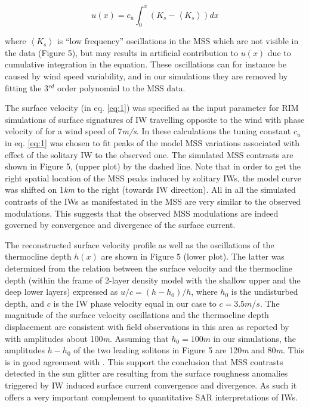 \documentclass[draft,grl]{agutex}
\begin{document}
\begin{article}
\begin{equation}
u(x) = c_u \int_0^x \left( K_s - \left\langle K_s \right\rangle \right) dx
\label{eq:1}
\end{equation}

\noindent where $\left\langle K_s \right\rangle$ is ``low frequency'' oscillations in the MSS which are not visible in the data (Figure 5), but may results in artificial contribution to $u(x)$ due to cumulative integration in the equation.  These oscillations can for instance be caused by wind speed variability, and in our simulations they are removed by fitting the 3${}^{rd}$ order polynomial to the MSS data.  

The surface velocity (in eq. \eqref{eq:1}) was specified as the input parameter for RIM simulations of surface signatures of IW travelling opposite to the wind with phase velocity of  for a wind speed of 7\textit{m/s}. In these calculations the tuning constant $c_u$ in eq. \eqref{eq:1} was chosen to fit peaks of the model MSS variations associated with effect of the solitary IW to the observed one. The simulated MSS contrasts are shown in Figure 5, (upper plot) by the dashed line. Note that in order to get the right spatial location of the MSS peaks induced by solitary IWs, the model curve was shifted on 1\textit{km} to the right (towards IW direction). All in all the simulated contrasts of the IWs as manifestated in the MSS are very similar to the observed modulations. This suggests that the observed MSS modulations are indeed governed by convergence and divergence of the surface current.

The reconstructed surface velocity profile as well as the oscillations of the thermocline depth $h(x)$ are shown in Figure 5 (lower plot). The latter was determined from the relation between the surface velocity and the thermocline depth (within the frame of 2-layer density model with the shallow upper and the deep lower layers) expressed as $u/c = \left( h-h_0 \right) / h $, where $h_0$ is the undisturbed depth, and $c$ is the IW phase velocity equal in our case to $c=3.5m/s$. The magnitude of the surface velocity oscillations and the thermocline depth displacement are consistent with field observations in this area as reported by \cite{Dulov1986} with amplitudes about 100\textit{m}. Assuming that $h_0 = 100m$ in our simulations, the amplitudes $h-h_0$ of the two leading solitons in Figure 5 are 120\textit{m} and 80\textit{m}. This is in good agreement with \citep{Dulov1986}. This support the conclusion that MSS contrasts detected in the sun glitter are resulting from the surface roughness anomalies triggered by IW induced surface current convergence and divergence. As such it offers a very important complement to quantitative SAR interpretations of IWs.



\end{article}
\end{document}
